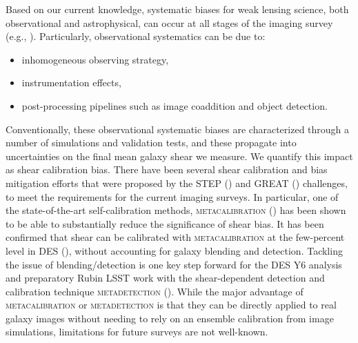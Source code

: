\documentclass[fleqn,usenatbib]{mnras}
\begin{document}
Based on our current knowledge, systematic biases for weak lensing science, both observational and astrophysical, can occur at all stages of the imaging survey (e.g., \citealt{2018ARA&A..56..393M}). Particularly, observational systematics can be due to: 
\begin{itemize}
    \item inhomogeneous observing strategy,
    \item instrumentation effects,
    \item post-processing pipelines such as image coaddition and object detection.
\end{itemize} 
Conventionally, these observational systematic biases are characterized through a number of simulations and validation tests, and these propagate into uncertainties on the final mean galaxy shear we measure. We quantify this impact as shear calibration bias. There have been several shear calibration and bias mitigation efforts that were proposed by the STEP (\citealt{2006MNRAS.368.1323H, 2007MNRAS.376...13M}) and GREAT (\citealt{2010MNRAS.405.2044B, 2013ApJS..205...12K, 2015MNRAS.450.2963M}) challenges, to meet the requirements for the current imaging surveys. In particular, one of the state-of-the-art self-calibration methods, \textsc{metacalibration} (\citealt{2017arXiv170202600H, 2017ApJ...841...24S}) has been shown to be able to substantially reduce the significance of shear bias. It has been confirmed that shear can be calibrated with \textsc{metacalibration} at the few-percent level in DES (\citealt{2018MNRAS.481.1149Z, 2020arXiv201103408G}), without accounting for galaxy blending and detection. Tackling the issue of blending/detection is one key step forward for the DES Y6 analysis and preparatory Rubin LSST work with the shear-dependent detection and calibration technique \textsc{metadetection} (\citealt{2020ApJ...902..138S}). While the major advantage of \textsc{metacalibration} or \textsc{metadetection} is that they can be directly applied to real galaxy images without needing to rely on an ensemble calibration from image simulations, limitations for future surveys are not well-known. 
\end{document}

